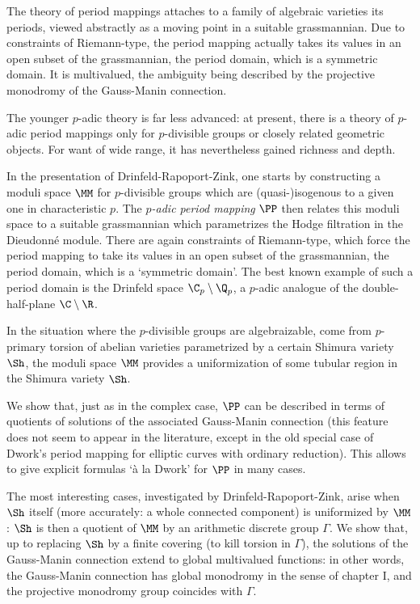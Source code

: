 \medskip

The theory of period mappings attaches to a family of algebraic
varieties its periods, viewed abstractly as a moving point in a suitable
grassmannian. Due to constraints of Riemann-type, the period mapping
actually takes its values in an open subset of the grassmannian, the
period domain, which is a symmetric domain. It is multivalued, the
ambiguity being described by the projective monodromy of the Gauss-Manin
connection.

The younger $p$-adic theory is far less advanced: at present, there is a
theory of $p$-adic period mappings only for $p$-divisible groups or
closely related geometric objects. For want of wide range, it has
nevertheless gained richness and depth.

\medskip

In the presentation of Drinfeld-Rapoport-Zink, one starts by
constructing a moduli space $\MM$ for $p$-divisible groups which are
(quasi-)isogenous to a given one in characteristic $p$. The {\it
$p$-adic period mapping} $\PP$ then relates this moduli space to a
suitable grassmannian which parametrizes the Hodge filtration in the
Dieudonn\'e module. There are again constraints of Riemann-type, which
force the period mapping to take its values in an open subset of the
grassmannian, the period domain, which is a `symmetric domain'. The best
known example of such a period domain is the Drinfeld space
$\C_p\setminus \Q_p$, a $p$-adic analogue of the double-half-plane
$\C\setminus \R$.

In the situation where the $p$-divisible groups are algebraizable, \ie
come from $p$-primary torsion of abelian varieties parametri\-zed by a
certain Shimura variety $\Sh$, the moduli space $\MM$ provides a
uniformization of some tubular region in the Shimura variety $\Sh$. 

We show that, just as in the complex case, $\PP$ can be described in
terms of quotients of solutions of the associated Gauss-Manin connection
(this feature does not seem to appear in the literature, except in the
old special case of Dwork's period mapping for elliptic curves with 
ordinary reduction). This allows to give explicit formulas `\`a la
Dwork' for $\PP$ in many cases.

The most interesting cases, investigated by Drinfeld-Rapoport-Zink,
arise when $\Sh$ itself (more accurately: a whole connected component) is
uniformized by $\MM$: $\Sh$ is then a quotient of $\MM$ by an arithmetic
discrete group $\Gamma$.  We show that, up to replacing $\Sh$ by a finite
covering (to kill torsion in $\Gamma$), the solutions of the Gauss-Manin 
connection extend to global multivalued functions: in other words, the
Gauss-Manin connection has global monodromy in the 
sense of chapter I, and the projective monodromy group coincides with
$\Gamma$. 

